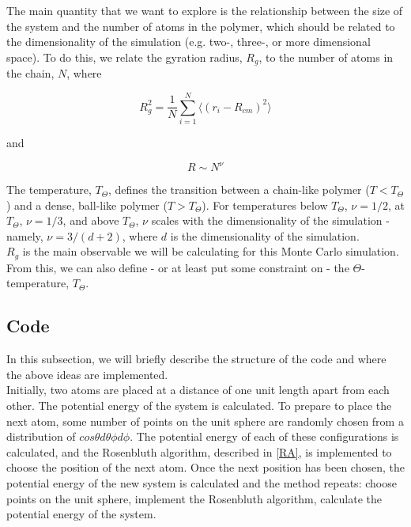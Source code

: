 \documentclass{article}
\begin{document}
\begin{multicols}{2}
The main quantity that we want to explore is the relationship between the size of the system and the number of atoms in the polymer, which should be related to the dimensionality of the simulation (e.g. two-, three-, or more dimensional space).  To do this, we relate the gyration radius, $R_g$, to the number of atoms in the chain, $N$, where 

\begin{equation}
\label{rg}
R_g^2 = \frac{1}{N} \sum \limits _{i=1}^{N} \langle (r_i - R_{cm})^2 \rangle
\end{equation} 

\noindent and 

\begin{equation}
\label{RNcomparison}
R \sim N^{\nu}
\end{equation}

The temperature, $T_{\Theta}$, defines the transition between a chain-like polymer ($T<T_{\Theta}$) and a dense, ball-like polymer ($T>T_{\Theta}$).  For temperatures below $T_{\Theta}$, $\nu = 1/ 2$, at $T_{\Theta}$, $\nu = 1/3$, and above $T_{\Theta}$, $\nu$ scales with the dimensionality of the simulation - namely, $\nu = 3/(d+2)$, where $d$ is the dimensionality of the simulation.  \cite{PhilNotes}\\

$R_g$ is the main observable we will be calculating for this Monte Carlo simulation.  From this, we can also define - or at least put some constraint on - the $\Theta $-temperature, $T_{\Theta}$.

\subsection{Code}

In this subsection, we will briefly describe the structure of the code and where the above ideas are implemented. \\

Initially, two atoms are placed at a distance of one unit length apart from each other.  The potential energy of the system is calculated.  To prepare to place the next atom, some number of points on the unit sphere are randomly chosen from a distribution of $cos\theta d\theta \phi d\phi$.  The potential energy of each of these configurations is calculated, and the Rosenbluth algorithm, described in \ref{RA}, is implemented to choose the position of the next atom.  Once the next position has been chosen, the potential energy of the new system is calculated and the method repeats:  choose points on the unit sphere, implement the Rosenbluth algorithm, calculate the potential energy of the system.  \\


\end{multicols}
\end{document}
